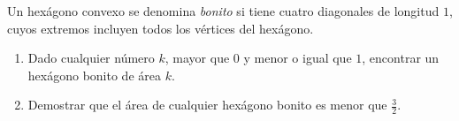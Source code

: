 Un hexágono convexo se denomina \emph{bonito} si tiene cuatro diagonales de longitud $1$, cuyos extremos incluyen todos los vértices del hexágono.
 \begin{enumerate} 
   \item  Dado cualquier número $k$, mayor que $0$ y menor o igual que $1$, encontrar un hexágono bonito de área $k$.
   \item  Demostrar que el área de cualquier hexágono bonito es menor que $\frac{3}{2}$.
 \end{enumerate} 
